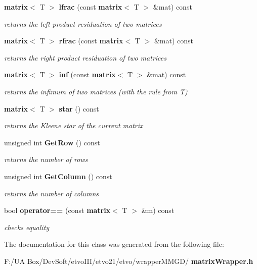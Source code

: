 \begin{DoxyCompactItemize}
\mbox{\label{classetvo_1_1matrix_a8820833053792ecd3d862d73576bb90d}} 
\textbf{ matrix}$<$ T $>$ \textbf{ lfrac} (const \textbf{ matrix}$<$ T $>$ \&mat) const
\begin{DoxyCompactList}\small\item\em returns the left product residuation of two matrices \end{DoxyCompactList}\item 
\mbox{\label{classetvo_1_1matrix_ae2b16ea0cc5279487975257aee47a545}} 
\textbf{ matrix}$<$ T $>$ \textbf{ rfrac} (const \textbf{ matrix}$<$ T $>$ \&mat) const
\begin{DoxyCompactList}\small\item\em returns the right product residuation of two matrices \end{DoxyCompactList}\item 
\mbox{\label{classetvo_1_1matrix_ac2189677830feabc6e308a5d9bf22817}} 
\textbf{ matrix}$<$ T $>$ \textbf{ inf} (const \textbf{ matrix}$<$ T $>$ \&mat) const
\begin{DoxyCompactList}\small\item\em returns the infimum of two matrices (with the rule from T) \end{DoxyCompactList}\item 
\mbox{\label{classetvo_1_1matrix_ae56483bd216936c4b617f37442d03957}} 
\textbf{ matrix}$<$ T $>$ \textbf{ star} () const
\begin{DoxyCompactList}\small\item\em returns the Kleene star of the current matrix \end{DoxyCompactList}\item 
\mbox{\label{classetvo_1_1matrix_a7b5aefcfde4dc4f2c8ac474979f818ec}} 
unsigned int \textbf{ Get\+Row} () const
\begin{DoxyCompactList}\small\item\em returns the number of rows \end{DoxyCompactList}\item 
\mbox{\label{classetvo_1_1matrix_ae584b7f3d692303116a953a0f006fd18}} 
unsigned int \textbf{ Get\+Column} () const
\begin{DoxyCompactList}\small\item\em returns the number of columns \end{DoxyCompactList}\item 
\mbox{\label{classetvo_1_1matrix_a45eb3ce5be46f7b41ae4572d7dd0462e}} 
bool \textbf{ operator==} (const \textbf{ matrix}$<$ T $>$ \&m) const
\begin{DoxyCompactList}\small\item\em checks equality \end{DoxyCompactList}\end{DoxyCompactItemize}


The documentation for this class was generated from the following file\+:\begin{DoxyCompactItemize}
\item 
F\+:/\+U\+A Box/\+Dev\+Soft/etvo\+I\+I\+I/etvo21/etvo/wrapper\+M\+M\+G\+D/\textbf{ matrix\+Wrapper.\+h}\end{DoxyCompactItemize}
